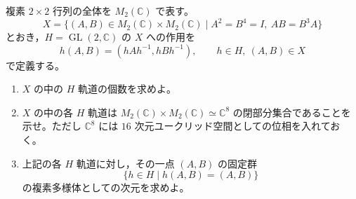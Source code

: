 \documentclass[12pt]{jlreq}
\newcommand{\C}{\mathbb{C}}
\newcommand{\GL}{\operatorname{GL}}
\begin{document}
複素 $2\times2$ 行列の全体を $M_2(\C)$ で表す。
\[
  X=\{(A,B)\in M_2(\C)\times M_2(\C) \mid A^2=B^4=I,\ AB=B^3A\}
\]
とおき，$H=\GL(2,\C)$ の $X$ への作用を
\[
  h(A,B)=(hAh^{-1},hBh^{-1}), \qquad h\in H,\ (A,B)\in X
\]
で定義する。

\begin{enumerate}
  \item $X$ の中の $H$ 軌道の個数を求めよ。
  \item $X$ の中の各 $H$ 軌道は $M_2(\C)\times M_2(\C)\simeq \C^8$ の閉部分集合であることを示せ。ただし $\C^8$ には $16$ 次元ユークリッド空間としての位相を入れておく。
  \item 上記の各 $H$ 軌道に対し，その一点 $(A,B)$ の固定群
  \[
    \{h\in H\mid h(A,B)=(A,B)\}
  \]
  の複素多様体としての次元を求めよ。
\end{enumerate}
\end{document}
